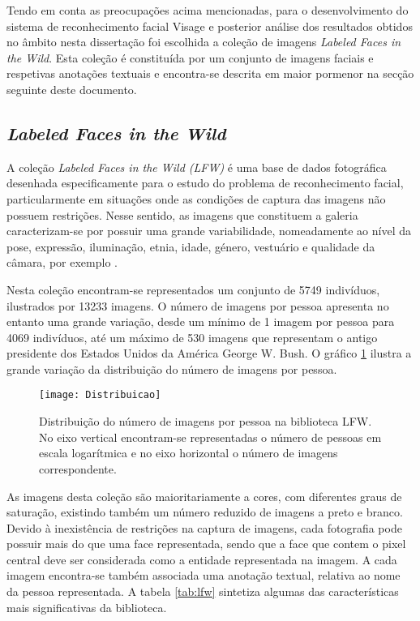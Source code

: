 Tendo em conta as preocupações acima mencionadas, para o desenvolvimento do sistema de reconhecimento facial  Visage e posterior análise dos resultados obtidos no âmbito nesta dissertação foi escolhida a coleção de imagens \textit{Labeled Faces in the Wild}. Esta coleção é constituída por um conjunto de imagens faciais e respetivas anotações textuais e encontra-se descrita em maior pormenor na secção seguinte deste documento.

\subsection{\textit{Labeled Faces in the Wild}}  \label{sec:lfw}
A coleção \textit{Labeled Faces in the Wild (LFW)} é uma base de dados fotográfica desenhada especificamente para o estudo do problema de reconhecimento facial, particularmente em situações onde as condições de captura das imagens não possuem restrições. Nesse sentido, as imagens que constituem a galeria caracterizam-se por possuir uma grande variabilidade, nomeadamente ao nível da pose, expressão, iluminação, etnia, idade, género, vestuário e qualidade da câmara, por exemplo \cite{Huang2007}.

Nesta coleção encontram-se representados um conjunto de 5749 indivíduos, ilustrados por 13233 imagens. O número de imagens por pessoa apresenta no entanto uma grande variação, desde um mínimo de 1 imagem por pessoa para 4069 indivíduos, até um máximo de 530 imagens que representam o antigo presidente dos Estados Unidos da América George W. Bush. O gráfico \ref{fig:distribuicaoLFW} ilustra a grande variação da distribuição do número de imagens por pessoa.

\begin{figure}[ht]
  \begin{center}
    \leavevmode
    \texttt{[image: Distribuicao]}
    \caption{Distribuição do número de imagens por pessoa na biblioteca LFW. No eixo vertical encontram-se representadas o número de pessoas em escala logarítmica e no eixo horizontal o número de imagens correspondente.}
    \label{fig:distribuicaoLFW}
  \end{center}
\end{figure}

As imagens desta coleção são maioritariamente a cores, com diferentes graus de saturação, existindo também um número reduzido de imagens a preto e branco. Devido à inexistência de restrições na captura de imagens, cada fotografia pode possuir mais do que uma face representada, sendo que a face que contem o pixel central deve ser considerada como a entidade representada na imagem. A cada imagem encontra-se também associada uma anotação textual, relativa ao nome da pessoa representada. A tabela \ref{tab:lfw} sintetiza algumas das características mais significativas da biblioteca.

